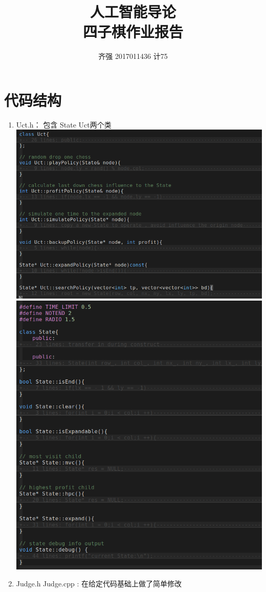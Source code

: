 \documentclass[]{article}
\title{人工智能导论\\ 四子棋作业报告}
\author{齐强 2017011436 计75}
\begin{document}
\maketitle
\tableofcontents
\newpage



\section{代码结构}
\begin{enumerate}
    \item {Uct.h： 包含 State Uct两个类\\
        \includegraphics[scale=0.6]{pic/1.png}\\
        \includegraphics[scale=0.7]{pic/2.png}\\
    }
    \item{Judge.h Judge.cpp : 在给定代码基础上做了简单修改
    }
\end{enumerate}
\end{document}
